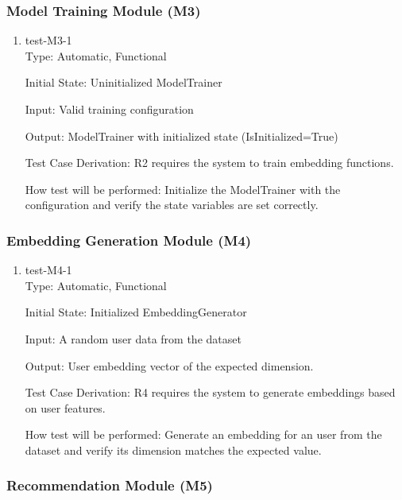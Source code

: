 \documentclass[12pt, titlepage]{article}
\begin{document}
\subsubsection{Model Training Module (M3)}

\begin{enumerate}

\item{test-M3-1\\}
Type: Automatic, Functional
					
Initial State: Uninitialized ModelTrainer
					
Input: Valid training configuration
					
Output: ModelTrainer with initialized state (IsInitialized=True)

Test Case Derivation: R2 requires the system to train embedding functions.

How test will be performed: Initialize the ModelTrainer with the configuration and verify the state variables are set correctly.

\end{enumerate}
\subsubsection{Embedding Generation Module (M4)}
\begin{enumerate}

  \item{test-M4-1\\}
  Type: Automatic, Functional
            
  Initial State: Initialized EmbeddingGenerator
            
  Input: A random user data from the dataset
            
  Output: User embedding vector of the expected dimension.
  
  Test Case Derivation: R4 requires the system to generate embeddings based on user features.
  
  How test will be performed: Generate an embedding for an user from the dataset and verify its dimension matches the expected value.
  
  \end{enumerate}

\subsubsection{Recommendation Module (M5)}
\end{document}
